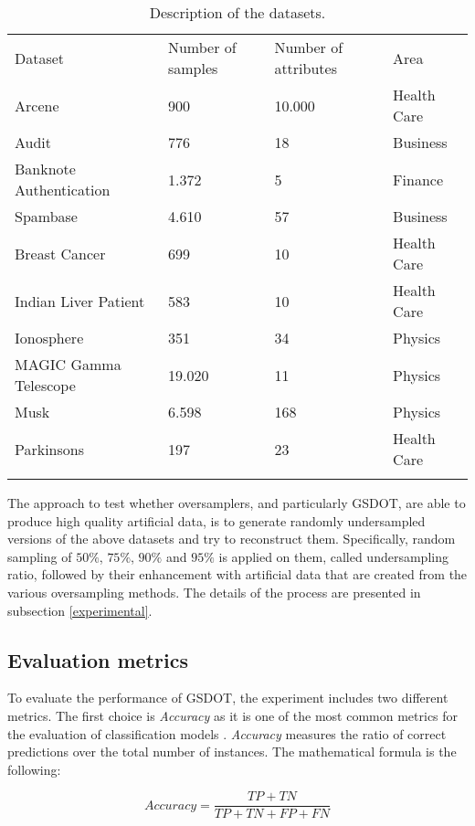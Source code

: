 \begin{table}
  \centering
  \caption{\label{tab:datasets}Description of the datasets.}
  \label{tab:description}
  \begin{tabular}{llll}
  \hline\noalign{\smallskip}
  Dataset & Number of samples & Number of attributes & Area \\
  \noalign{\smallskip}\hline\noalign{\smallskip}
  Arcene & 900 & 10.000 & Health Care \\
	Audit & 776 & 18 & Business \\
	Banknote Authentication & 1.372 & 5 & Finance \\
	Spambase & 4.610 & 57 & Business\\
	Breast Cancer & 699 & 10 & Health Care\\
	Indian Liver Patient & 583 & 10 & Health Care\\
	Ionosphere & 351 & 34 & Physics\\
	MAGIC Gamma Telescope & 19.020 & 11 & Physics\\
	Musk & 6.598 & 168 & Physics\\
	Parkinsons & 197 & 23 & Health Care\\
  \noalign{\smallskip}\hline
  \end{tabular}
\end{table}

The approach to test whether oversamplers, and particularly GSDOT, are able to produce high quality artificial data, is to generate randomly undersampled versions of the above datasets and try to reconstruct them. Specifically, random sampling of $50\%$, $75\%$, $90\%$ and $95\%$ is applied on them, called undersampling ratio, followed by their enhancement with artificial data that are created from the various oversampling methods. The details of the process are presented in subsection \ref{experimental}.

\subsection{Evaluation metrics}

To evaluate the performance of GSDOT, the experiment includes two different metrics. The first choice is \textit{Accuracy} as it is one of the most common metrics for the evaluation of classification models \cite{M.2015}. \textit{Accuracy} measures the ratio of correct predictions over the total number of instances. The mathematical formula is the following:

$$ \textit{Accuracy} = \frac{TP + TN}{TP +TN + FP + FN}$$

